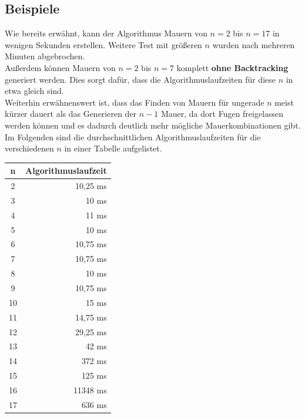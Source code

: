 \documentclass[a4paper,12pt]{article}
\begin{document}
\subsection{Beispiele}
Wie bereits erwähnt, kann der Algorithmus Mauern von $n = 2$ bis $n = 17$ in wenigen Sekunden erstellen. Weitere Test mit größeren $n$ wurden nach mehreren Minuten abgebrochen.
\\[0.4cm]
Außerdem können Mauern von $n = 2$ bis $n = 7$ komplett \textbf{ohne Backtracking} generiert werden. Dies sorgt dafür, dass die Algorithmuslaufzeiten für diese $n$ in etwa gleich sind.
\\[0.4cm]
Weiterhin erwähnenswert ist, dass das Finden von Mauern für ungerade $n$ meist kürzer dauert als das Generieren der $n - 1$ Mauer, da dort Fugen freigelassen werden können und es dadurch deutlich mehr mögliche Mauerkombinationen gibt.
\\[0.4cm]
Im Folgenden sind die durchschnittlichen Algorithmuslaufzeiten für die verschiedenen $n$ in einer Tabelle aufgelistet.
\vspace{0.4cm}
\begin{table}[H]
\begin{center}
\begin{tabular}{cr}
\hline
n  & Algorithmuslaufzeit \\ \hline
2  & 10,25 ms            \\
3  & 10 ms               \\
4  & 11 ms               \\
5  & 10 ms               \\
6  & 10,75 ms            \\
7  & 10,75 ms            \\
8  & 10 ms               \\
9  & 10,75 ms            \\
10 & 15 ms               \\
11 & 14,75 ms            \\
12 & 29,25 ms            \\
13 & 42 ms               \\
14 & 372 ms              \\
15 & 125 ms              \\
16 & 11348 ms            \\
17 & 636 ms             
\end{tabular}
\end{center}
\end{table}
\end{document}
